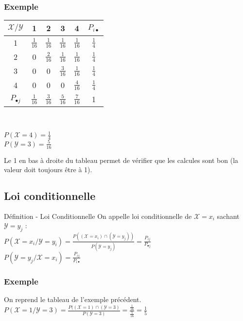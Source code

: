 \documentclass[a4paper, 12pt]{article}
\begin{document}
\subsubsection*{Exemple}
{\Large
\begin{center}
\begin{tabular}{|c|cccc|c|}
	\hline
	$\mathcal{X/Y}$ & 1 & 2  & 3 & 4 & $P_{i\bullet}$ \\
	\hline
	1 & $\frac{1}{16}$ & $\frac{1}{16}$ & $\frac{1}{16}$ & $\frac{1}{16}$ & $\frac{1}{4}$ \\
	2 & 0 & $\frac{2}{16}$ & $\frac{1}{16}$ & $\frac{1}{16}$ & $\frac{1}{4}$ \\
	3 & 0 & 0 & $\frac{3}{16}$ & $\frac{1}{16}$ & $\frac{1}{4}$ \\
	4 & 0 & 0 & 0 & $\frac{4}{16}$ & $\frac{1}{4}$ \\
	\hline
	$P_{\bullet j}$ & $\frac{1}{16}$ & $\frac{3}{16}$ & $\frac{5}{16}$ & $\frac{7}{16}$ & 1 \\
	\hline
\end{tabular}\\
\end{center}
}
\begin{flushleft}
$P (\mathcal{X} = 4) = \frac{1}{4}$\\
$P (\mathcal{Y} = 3) = \frac{5}{16}$\\
\end{flushleft}

Le 1 en bas à droite du tableau permet de vérifier que les calcules sont bon (la valeur doit toujours être à 1).


\subsection{Loi conditionnelle}
\begin{definition}{Définition - Loi Conditionnelle}
On appelle loi conditionnelle de $\mathcal{X} = x_i$ sachant $\mathcal{Y} = y_j$ : \\
$P (\mathcal{X} = x_i / \mathcal{Y} = y_i) = \frac{P ((\mathcal{X} = x_i) \cap (\mathcal{Y} = y_j))}{P (\mathcal{Y} = y_j)} = \frac{P_{ij}}{P_{\bullet j}}$ \\
$P (\mathcal{Y} = y_j / \mathcal{X} = x_i) = \frac{P_{ij}}{P_{i \bullet}}$ \\
\end{definition}


\subsubsection*{Exemple}
On reprend le tableau de l'exemple précédent.\\
$P (\mathcal{X} = 1 / \mathcal{Y} = 3) = \frac{P((\mathcal{X} = 1) \cap (\mathcal{Y} = 3)}{P (\mathcal{Y} = 3)} = \frac{\frac{1}{16}}{\frac{5}{16}} = \frac{1}{5}$\\
\end{document}
